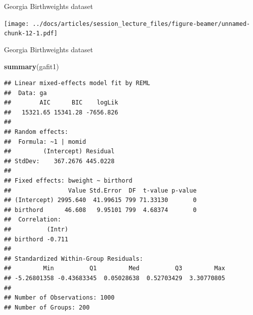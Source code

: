 \documentclass[
  ignorenonframetext,
]{beamer}
\newenvironment{Shaded}{\begin{snugshade}}{\end{snugshade}}
\newcommand{\KeywordTok}[1]{\textcolor[rgb]{0.13,0.29,0.53}{\textbf{#1}}}
\newcommand{\NormalTok}[1]{#1}
\begin{document}
\begin{frame}{Georgia Birthweights dataset}
\protect\hypertarget{georgia-birthweights-dataset-2}{}

\texttt{[image: ../docs/articles/session\_lecture\_files/figure-beamer/unnamed-chunk-12-1.pdf]}

\end{frame}

\begin{frame}[fragile]{Georgia Birthweights dataset}
\protect\hypertarget{georgia-birthweights-dataset-3}{}

\tiny

\begin{Shaded}
\begin{Highlighting}[]
\KeywordTok{summary}\NormalTok{(gafit1)}
\end{Highlighting}
\end{Shaded}

\begin{verbatim}
## Linear mixed-effects model fit by REML
##  Data: ga 
##        AIC      BIC    logLik
##   15321.65 15341.28 -7656.826
## 
## Random effects:
##  Formula: ~1 | momid
##         (Intercept) Residual
## StdDev:    367.2676 445.0228
## 
## Fixed effects: bweight ~ birthord 
##                Value Std.Error  DF  t-value p-value
## (Intercept) 2995.640  41.99615 799 71.33130       0
## birthord      46.608   9.95101 799  4.68374       0
##  Correlation: 
##          (Intr)
## birthord -0.711
## 
## Standardized Within-Group Residuals:
##         Min          Q1         Med          Q3         Max 
## -5.26801358 -0.43683345  0.05028638  0.52703429  3.30770805 
## 
## Number of Observations: 1000
## Number of Groups: 200
\end{verbatim}

\end{frame}
\end{document}
